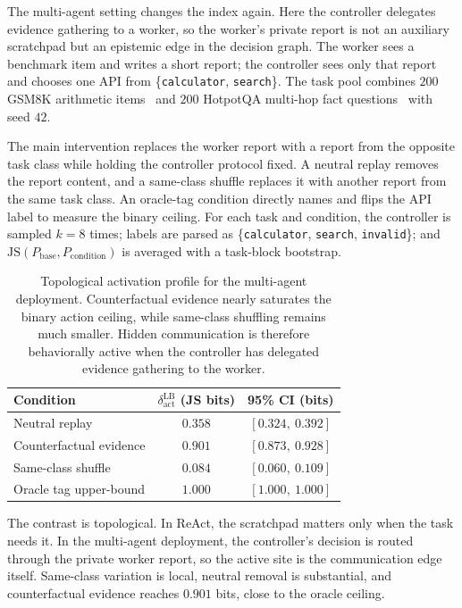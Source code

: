 \documentclass{article}
\begin{document}
  The multi-agent setting changes the index again. Here the controller delegates
   evidence gathering to a worker, so the worker's private report is not an
  auxiliary scratchpad but an epistemic edge in the decision graph. The worker
  sees a benchmark item and writes a short report; the controller sees only that
   report and chooses one API from \{\texttt{calculator}, \texttt{search}\}. The
   task pool combines $200$ GSM8K arithmetic items~\citep{cobbe2021training} and
   $200$ HotpotQA multi-hop fact questions~\citep{yang2018hotpotqa} with seed
  $42$.

  The main intervention replaces the worker report with a report from the
  opposite task class while holding the controller protocol fixed. A neutral
  replay removes the report content, and a same-class shuffle replaces it with
  another report from the same task class. An oracle-tag condition directly
  names and flips the API label to measure the binary ceiling. For each task and
   condition, the controller is sampled $k{=}8$ times; labels are parsed as
  \{\texttt{calculator}, \texttt{search}, \texttt{invalid}\}; and
  $\mathrm{JS}(P_\text{base},P_\text{condition})$ is averaged with a task-block
  bootstrap.

  \begin{table}[t]
  \centering
  \begin{tabular}{lcc}
  \toprule
  Condition & $\delta_\text{act}^\text{LB}$ (JS bits) & 95\% CI (bits) \\
  \midrule
  Neutral replay & $0.358$ & $[0.324,\ 0.392]$ \\
  Counterfactual evidence & $0.901$ & $[0.873,\ 0.928]$ \\
  Same-class shuffle & $0.084$ & $[0.060,\ 0.109]$ \\
  Oracle tag upper-bound & $1.000$ & $[1.000,\ 1.000]$ \\
  \bottomrule
  \end{tabular}
  \caption{Topological activation profile for the multi-agent deployment.
  Counterfactual evidence nearly saturates the binary action ceiling, while
  same-class shuffling remains much smaller. Hidden communication is therefore
  behaviorally active when the controller has delegated evidence gathering to
  the worker.}
  \label{tab:multi-agent-dynamic}
  \end{table}

  The contrast is topological. In ReAct, the scratchpad matters only when the
  task needs it. In the multi-agent deployment, the controller's decision is
  routed through the private worker report, so the active site is the
  communication edge itself. Same-class variation is local, neutral removal is
  substantial, and counterfactual evidence reaches $0.901$ bits, close to the
  oracle ceiling.
\end{document}
